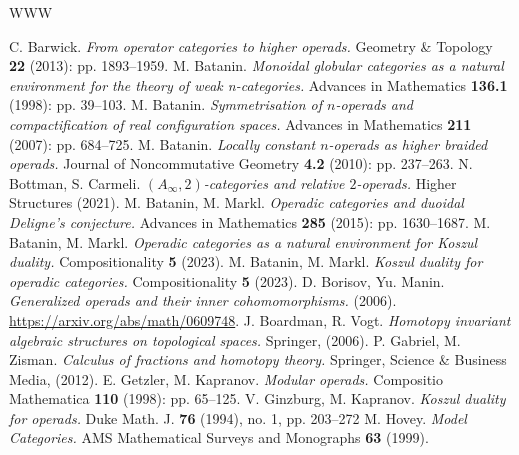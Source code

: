 \documentclass[letterpaper,12pt,leqno]{article}
\numberwithin{equation}{theorem}
\begin{document}

\vfill\eject


\begin{thebibliography}{WWW}
 C. Barwick. {\em From operator categories to higher operads.} Geometry \& Topology {\bf 22} (2013): pp. 1893--1959.
 M. Batanin. {\em Monoidal globular categories as a natural environment for the theory of weak n-categories.} Advances in Mathematics {\bf 136.1} (1998): pp. 39--103.
 M. Batanin. {\em Symmetrisation of $n$-operads and compactification of real configuration spaces.} Advances in Mathematics {\bf 211} (2007): pp. 684--725.
 M. Batanin. {\em Locally constant $ n $-operads as higher braided operads.} Journal of Noncommutative Geometry {\bf 4.2} (2010): pp. 237--263.
 N. Bottman, S. Carmeli. {\em $(A_\infty, 2)$-categories and relative $2$-operads.} Higher Structures (2021).
 M. Batanin, M. Markl. {\em Operadic categories and duoidal Deligne's conjecture.} Advances in Mathematics {\bf 285} (2015): pp. 1630--1687.
 M. Batanin, M. Markl. {\em Operadic categories as a natural environment for Koszul duality.} Compositionality {\bf 5} (2023).
 M. Batanin, M. Markl. {\em Koszul duality for operadic categories.} Compositionality {\bf 5} (2023).
 D. Borisov, Yu. Manin. {\em Generalized operads and their inner cohomomorphisms.} (2006). \href{https://arxiv.org/abs/math/0609748}{https://arxiv.org/abs/math/0609748}.
 J. Boardman, R. Vogt. {\em Homotopy invariant algebraic structures on topological spaces.} Springer, (2006).
 P. Gabriel, M. Zisman. {\em Calculus of fractions and homotopy theory.} Springer, Science \& Business Media, (2012).
 E. Getzler, M. Kapranov. {\em Modular operads.} Compositio Mathematica {\bf 110} (1998): pp. 65--125.
 V. Ginzburg, M. Kapranov. {\em Koszul duality for operads.} Duke Math. J. {\bf 76} (1994), no. 1, pp. 203--272
 M. Hovey. {\em Model Categories.} AMS Mathematical Surveys and Monographs {\bf 63} (1999).

\end{thebibliography}
\end{document}
